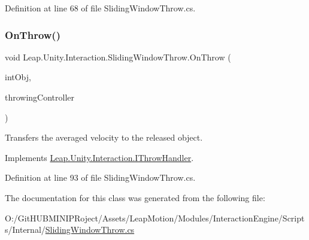 Definition at line 68 of file Sliding\+Window\+Throw.\+cs.

\mbox{\label{class_leap_1_1_unity_1_1_interaction_1_1_sliding_window_throw_adff33de5d0a761227c5e3ebd80e12e96}} 
\subsubsection{\texorpdfstring{OnThrow()}{OnThrow()}}
{\footnotesize\ttfamily void Leap.\+Unity.\+Interaction.\+Sliding\+Window\+Throw.\+On\+Throw (\begin{DoxyParamCaption}\item[{\mbox{\hyperlink{class_leap_1_1_unity_1_1_interaction_1_1_interaction_behaviour}{Interaction\+Behaviour}}}]{int\+Obj,  }\item[{\mbox{\hyperlink{class_leap_1_1_unity_1_1_interaction_1_1_interaction_controller}{Interaction\+Controller}}}]{throwing\+Controller }\end{DoxyParamCaption})}



Transfers the averaged velocity to the released object. 



Implements \mbox{\hyperlink{interface_leap_1_1_unity_1_1_interaction_1_1_i_throw_handler_a29ebb0b201a7ae85dc484d91a716ecb6}{Leap.\+Unity.\+Interaction.\+I\+Throw\+Handler}}.



Definition at line 93 of file Sliding\+Window\+Throw.\+cs.



The documentation for this class was generated from the following file\+:\begin{DoxyCompactItemize}
\item 
O\+:/\+Git\+H\+U\+B\+M\+I\+N\+I\+P\+Roject/\+Assets/\+Leap\+Motion/\+Modules/\+Interaction\+Engine/\+Scripts/\+Internal/\mbox{\hyperlink{_sliding_window_throw_8cs}{Sliding\+Window\+Throw.\+cs}}\end{DoxyCompactItemize}
